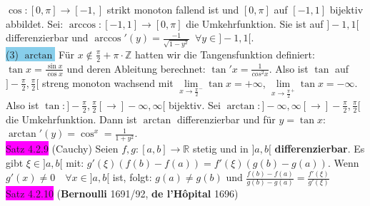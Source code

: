 \documentclass[landscape, 10pt]{article}
\newcommand{\R}{\mathbb{R}}
\begin{document}
\begin{multicols}{3}
                            $\cos:[0,\pi]\longrightarrow[-1,]$ strikt 
                            monoton fallend ist
                            und $[0,\pi]$ auf $[-1,1]$ bijektiv abbildet. Sei:
                            $\arccos:[-1,1]\longrightarrow[0,\pi]$ die 
                            Umkehrfunktion. Sie ist auf $]-1,1[$ 
                            differenzierbar und
                            $\arccos'(y)=\frac{-1}{\sqrt{1-y^2}}\enspace
                            \forall y\in]-1,1[$.\\
                     \colorbox{SkyBlue}{(3) $\arctan$}
                            Für $x\notin\frac{\pi}{2}+\pi\cdot\mathbb{Z}$
                            hatten wir die Tangensfunktion definiert:
                            $\tan x=\frac{\sin x}{\cos x}$ und deren Ableitung 
                            berechnet:
                            $\tan'x=\frac{1}{cos^2x}$. Also ist $\tan$ auf
                            $]-\frac{\pi}{2},\frac{\pi}{2}[$ streng monoton wachsend mit
                            $\lim\limits_{x\to\frac{\pi}{2}^{-}}\tan x=+\infty$,
                            $\lim\limits_{x\to\frac{\pi}{2}^{+}}\tan x=-\infty$.
                            Also ist 
                            $\tan:]-\frac{\pi}{2},\frac{\pi}{2}[
                            \longrightarrow]-\infty,\infty[$ bijektiv. Sei
                            $\arctan:]-\infty,\infty[\longrightarrow
                            ]-\frac{\pi}{2},\frac{\pi}{2}[$ die 
                            Umkehrfunktion.
                            Dann ist $\arctan$ differenzierbar und für 
                            $y=\tan x$: $\arctan'(y)=\cos^x=\frac{1}{1+y^2}$.\\
              \colorbox{magenta}{Satz 4.2.9} 
              (Cauchy)
                     Seien 
                     \textcolor{NavyBlue}{$f,g:[a,b]\longrightarrow\R$}
                     stetig und in \textcolor{NavyBlue}{$]a,b[$} 
                     \textbf{differenzierbar}.
                     Es gibt \textcolor{NavyBlue}{$\xi\in]a,b[$} mit: 
                     \textcolor{NavyBlue}{$g'(\xi)(f(b)-f(a))=f'(\xi)(g(b)-g(a))$}. 
                     Wenn \textcolor{NavyBlue}{$g'(x)\neq0\quad\forall x\in]a,b[$} 
                     ist, folgt: \textcolor{NavyBlue}{$g(a)\neq g(b)$} und 
                     \textcolor{NavyBlue}{
                     $\frac{f(b)-f(a)}{g(b)-g(a)}=\frac{f'(\xi)}{g'(\xi)}$}\\ 
              \colorbox{magenta}{Satz 4.2.10} 
              (\textbf{Bernoulli} 1691/92, \textbf{de l'Hôpital} 1696) 

\end{multicols}
\end{document}
